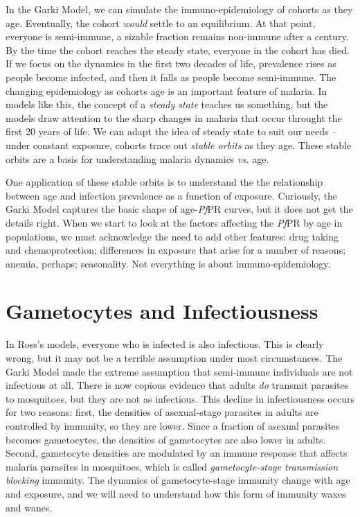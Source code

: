 \documentclass[
]{book}
\begin{document}
In the Garki Model, we can simulate the immuno-epidemiology of cohorts as they age. Eventually, the cohort \emph{would} settle to an equilibrium. At that point, everyone is semi-immune, a sizable fraction remains non-immune after a century. By the time the cohort reaches the steady state, everyone in the cohort has died. If we focus on the dynamics in the first two decades of life, prevalence rises as people become infected, and then it falls as people become semi-immune. The changing epidemiology as cohorts age is an important feature of malaria. In models like this, the concept of a \emph{steady state} teaches us something, but the models draw attention to the sharp changes in malaria that occur throught the first 20 years of life. We can adapt the idea of steady state to suit our needs -- under constant exposure, cohorts trace out \emph{stable orbits} as they age. These stable orbits are a basis for understanding malaria dynamics \emph{vs.} age.

One application of these stable orbits is to understand the the relationship between age and infection prevalence as a function of exposure. Curiously, the Garki Model captures the basic shape of age-\emph{Pf}PR curves, but it does not get the details right. When we start to look at the factors affecting the \emph{Pf}PR by age in populations, we must acknowledge the need to add other features: drug taking and chemoprotection; differences in exposure that arise for a number of reasons; anemia, perhaps; seasonality. Not everything is about immuno-epidemiology.

\section{Gametocytes and Infectiousness}\label{gametocytes-and-infectiousness}

In Ross's models, everyone who is infected is also infectious. This is clearly wrong, but it may not be a terrible assumption under most circumstances. The Garki Model made the extreme assumption that semi-immune individuals are not infectious at all. There is now copious evidence that adults \emph{do} transmit parasites to mosquitoes, but they are not as infectious. This decline in infectiousness occurs for two reasons: first, the densities of asexual-stage parasites in adults are controlled by immunity, so they are lower. Since a fraction of asexual parasites becomes gametocytes, the densities of gametocytes are also lower in adults. Second, gametocyte densities are modulated by an immune response that affects malaria parasites in mosquitoes, which is called \emph{gametocyte-stage transmission blocking} immunity. The dynamics of gametocyte-stage immunity change with age and exposure, and we will need to understand how this form of immunity waxes and wanes.
\end{document}
